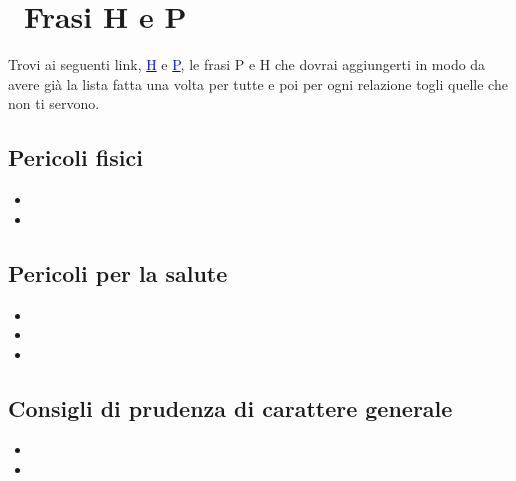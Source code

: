 \section*{\quad \   Frasi H e P}
Trovi ai seguenti link, \href{https://it.wikipedia.org/wiki/Indicazioni_di_pericolo_H}{\textcolor{blue}{H}} e \href{https://it.wikipedia.org/wiki/Consigli_P}{\textcolor{blue}{P}}, le frasi P e H che dovrai aggiungerti in modo da avere già la lista fatta una volta per tutte e poi per ogni relazione togli quelle che non ti servono.

\begingroup
\begin{multicols}{2}
\scriptsize
\subsection*{Pericoli fisici}
\begin{itemize}
    \item {}
    \item {}
\end{itemize}
\subsection*{Pericoli per la salute}
\begin{itemize}
    \item {}
    \item {}
    \item
\end{itemize}
\subsection*{Consigli di prudenza di carattere generale}
\begin{itemize}
    \item {}
    \item
\end{itemize}
\end{multicols}
\endgroup


